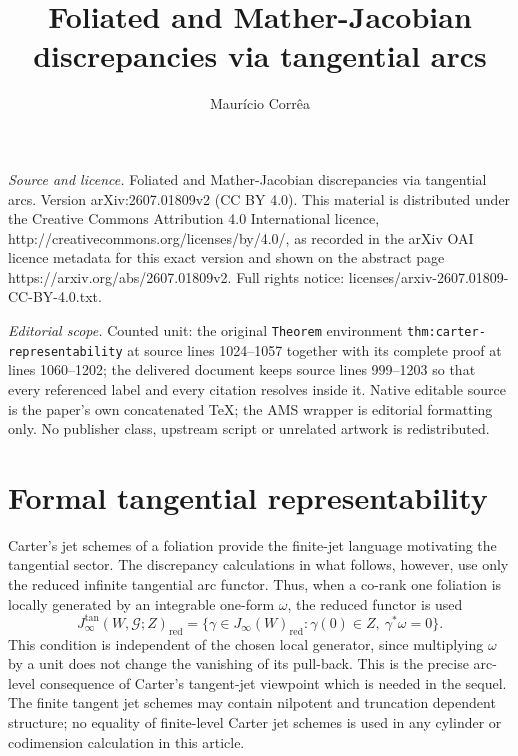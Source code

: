 \documentclass[10pt,a4paper]{amsart}
\numberwithin{equation}{section}
\newcommand{\red}{\mathrm{red}}
\newcommand{\cG}{\mathcal G}
\begin{document}
\title[Foliated and Mather-Jacobian discrepancies via tangential ar]{Foliated and Mather-Jacobian discrepancies via tangential arcs}
\author{Maurício Corrêa}
\date{}
\maketitle
\noindent\emph{Source and licence.} Foliated and Mather-Jacobian discrepancies via tangential arcs. Version arXiv:2607.01809v2 (CC BY 4.0). This material is distributed under the Creative Commons Attribution 4.0 International licence, http://creativecommons.org/licenses/by/4.0/, as recorded in the arXiv OAI licence metadata for this exact version and shown on the abstract page https://arxiv.org/abs/2607.01809v2. Full rights notice: licenses/arxiv-2607.01809-CC-BY-4.0.txt.\par\smallskip
\noindent\textit{Editorial scope.} Counted unit: the original \texttt{Theorem} environment \texttt{thm:carter-representability} at source lines 1024--1057 together with its complete proof at lines 1060--1202; the delivered document keeps source lines 999--1203 so that every referenced label and every citation resolves inside it. Native editable source is the paper's own concatenated TeX; the AMS wrapper is editorial formatting only. No publisher class, upstream script or unrelated artwork is redistributed.
\section{Formal tangential representability}
\label{sec:formal}

Carter's jet schemes of a foliation \cite{Carter,CarterThesis} provide the
finite-jet language motivating the tangential sector.  The discrepancy
calculations in what follows, however, use only the reduced infinite tangential arc
functor.  Thus, when a co-rank one foliation is locally generated by an
integrable one-form $\omega$, the reduced functor is used
\[
J_\infty^{\tan}(W,\cG;Z)_{\red}
=
\{\gamma\in J_\infty(W)_{\red}:\gamma(0)\in Z,\ \gamma^*\omega=0\}.
\]
This condition is independent of the chosen local generator, since
multiplying $\omega$ by a unit does not change the vanishing of its pull-back.
This is the precise arc-level consequence of Carter's tangent-jet viewpoint
which is needed in the sequel.  The finite tangent jet schemes may contain
nilpotent and truncation dependent structure; no equality of finite-level
Carter jet schemes is used in any cylinder or codimension calculation in this
article.
\end{document}
